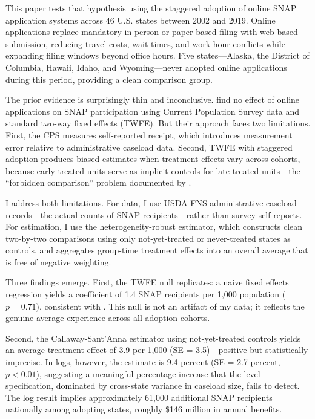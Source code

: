 \documentclass[12pt]{article}
\begin{document}
This paper tests that hypothesis using the staggered adoption of online SNAP application systems across 46 U.S. states between 2002 and 2019. Online applications replace mandatory in-person or paper-based filing with web-based submission, reducing travel costs, wait times, and work-hour conflicts while expanding filing windows beyond office hours. Five states---Alaska, the District of Columbia, Hawaii, Idaho, and Wyoming---never adopted online applications during this period, providing a clean comparison group.

The prior evidence is surprisingly thin and inconclusive. \citet{jones2021} find no effect of online applications on SNAP participation using Current Population Survey data and standard two-way fixed effects (TWFE). But their approach faces two limitations. First, the CPS measures self-reported receipt, which introduces measurement error relative to administrative caseload data. Second, TWFE with staggered adoption produces biased estimates when treatment effects vary across cohorts, because early-treated units serve as implicit controls for late-treated units---the ``forbidden comparison'' problem documented by \citet{goodman2021}.

I address both limitations. For data, I use USDA FNS administrative caseload records---the actual counts of SNAP recipients---rather than survey self-reports. For estimation, I use the \citet{callaway2021} heterogeneity-robust estimator, which constructs clean two-by-two comparisons using only not-yet-treated or never-treated states as controls, and aggregates group-time treatment effects into an overall average that is free of negative weighting.

Three findings emerge. First, the TWFE null replicates: a naive fixed effects regression yields a coefficient of 1.4 SNAP recipients per 1,000 population ($p = 0.71$), consistent with \citet{jones2021}. This null is not an artifact of my data; it reflects the genuine average experience across all adoption cohorts.

Second, the Callaway-Sant'Anna estimator using not-yet-treated controls yields an average treatment effect of 3.9 per 1,000 (SE = 3.5)---positive but statistically imprecise. In logs, however, the estimate is 9.4 percent (SE = 2.7 percent, $p < 0.01$), suggesting a meaningful percentage increase that the level specification, dominated by cross-state variance in caseload size, fails to detect. The log result implies approximately 61,000 additional SNAP recipients nationally among adopting states, roughly \$146 million in annual benefits.
\end{document}
